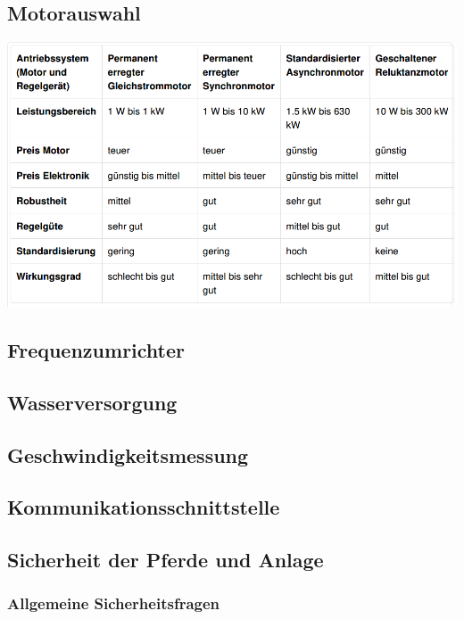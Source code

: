 \documentclass[12pt]{scrartcl}
\begin{document}
\subsection{Motorauswahl}
\label{sec:motorauswahl}

\begin{center}
	\includegraphics[width=1\textwidth]{TabelleMotor}
\end{center}

\newpage
\subsection{Frequenzumrichter}
\label{sec:frequenzumrichter}
\newpage
\subsection{Wasserversorgung}
\label{sec:wasserversorgung}
\newpage
\subsection{Geschwindigkeitsmessung}
\label{sec:geschwindigkeitsmessung}
\newpage
\subsection{Kommunikationsschnittstelle}
\label{sec:kommunikationsschnittstelle}
\newpage
\subsection{Sicherheit der Pferde und Anlage}
\label{sec:sicherheitDerPferdeUndAnlage}

\subsubsection{Allgemeine Sicherheitsfragen}
\label{sec:allgemeineSicherheitsfragen}
\end{document}
